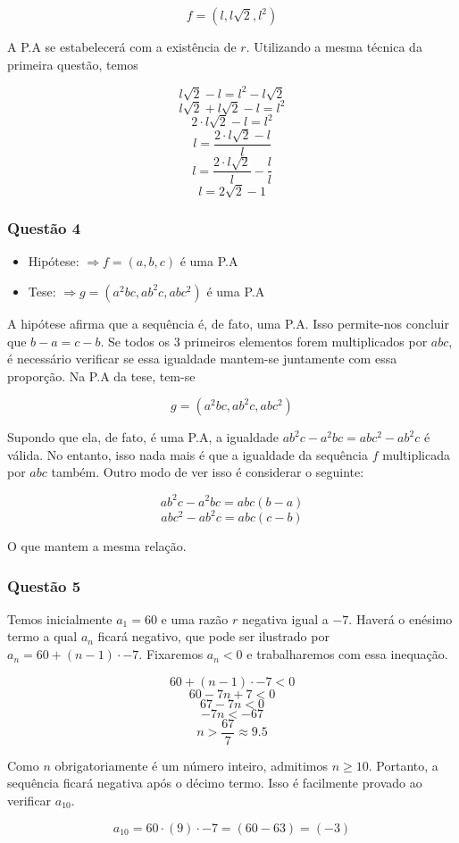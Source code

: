 \documentclass[11pt]{article}
\begin{document}
\begin{tcolorbox}[colback=LightYellow]
\[f = (l, l\sqrt{2}, l^{2})\]
\end{tcolorbox}

A P.A se estabelecerá com a existência de $r$. Utilizando a mesma técnica da primeira questão, temos

\begin{tcolorbox}[colback=LightYellow]
\[l\sqrt{2} - l = l^{2} - l\sqrt{2} \]
\[l\sqrt{2} + l\sqrt{2} - l = l^{2}\]
\[2\cdot l\sqrt{2} - l = l^{2}\]
\[l = \frac{2\cdot l\sqrt{2} - l}{l}\]
\[l = \frac{2\cdot l\sqrt{2}}{l} - \frac{l}{l}\]
\[l = 2\sqrt{2} - 1\]
\end{tcolorbox}

\subsubsection{Questão 4}

\begin{tcolorbox}[colback=LightYellow]
\begin{itemize}
  \item Hipótese: $\Rightarrow f = (a, b, c)$ é uma P.A
  \item Tese: $\Rightarrow g = (a^{2}bc, ab^{2}c, abc^{2})$ é uma P.A
\end{itemize}
\end{tcolorbox}

A hipótese afirma que a sequência é, de fato, uma P.A. Isso permite-nos concluir que $b - a = c - b$. Se todos os 3 primeiros elementos forem multiplicados por $abc$, é necessário verificar se essa igualdade mantem-se juntamente com essa proporção. Na P.A da tese, tem-se

\[g = (a^{2}bc, ab^{2}c, abc^{2})\]

Supondo que ela, de fato, é uma P.A, a igualdade $ab^{2}c - a^{2}bc = abc^{2} - ab^{2}c$ é válida. No entanto, isso nada mais é que a igualdade da sequência $f$ multiplicada por $abc$ também. Outro modo de ver isso é considerar o seguinte:

\begin{tcolorbox}[colback=LightYellow]
\[ab^{2}c - a^{2}bc = abc(b - a)\]
\[abc^{2} - ab^{2}c = abc(c - b)\]
\end{tcolorbox}

O que mantem a mesma relação.

\subsubsection{Questão 5}

Temos inicialmente $a_{1} = 60$ e uma razão $r$ negativa igual a $-7$. Haverá o enésimo termo a qual $a_{n}$ ficará negativo, que pode ser ilustrado por $a_{n} = 60 + (n - 1)\cdot -7$. Fixaremos $a_{n} < 0$ e trabalharemos com essa inequação.

\[60 + (n - 1)\cdot -7 < 0\]
\[60 - 7n + 7 < 0\]
\[67 - 7n < 0\]
\[-7n < -67\]
\[n > \frac{67}{7} \approx 9.5\]

Como $n$ obrigatoriamente é um número inteiro, admitimos $n \geq 10$. Portanto, a sequência ficará negativa após o décimo termo. Isso é facilmente provado ao verificar $a_{10}$.

\[a_{10} = 60\cdot (9)\cdot -7 = (60 - 63) = (-3)\]
\end{document}
